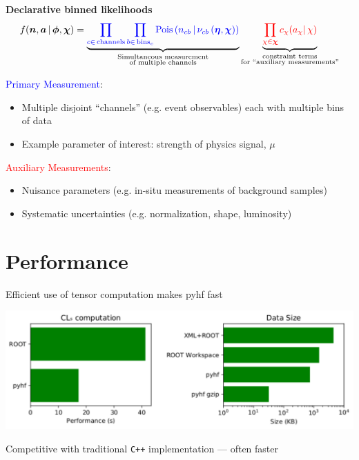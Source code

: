 \documentclass[a0paper,fleqn]{betterposter}
\begin{document}
{ \textbf{Declarative binned likelihoods}
 \vspace{1em}
 \[
  f(\bm{n}, \bm{a} \,|\,\bm{\phi},\bm{\chi}) = \underbrace{\color{blue}{\prod_{c\in\mathrm{\,channels}} \prod_{b \in \mathrm{\,bins}_c}\textrm{Pois}\left(n_{cb} \,\middle|\, \nu_{cb}\left(\bm{\eta},\bm{\chi}\right)\right)}}_{\substack{\text{Simultaneous measurement}\\%
    \text{of multiple channels}}} \underbrace{\color{red}{\prod_{\chi \in \bm{\chi}} c_{\chi}(a_{\chi} |\, \chi)}}_{\substack{\text{constraint terms}\\%
    \text{for }\text{``auxiliary measurements''}}}
 \]
 \vspace{1em}

 \textcolor{blue}{Primary Measurement}:
 \begin{itemize}
  \item Multiple disjoint ``channels'' (e.g.\!\!\!\! event observables) each with multiple bins of data
  \item Example parameter of interest: strength of physics signal, $\mu$
 \end{itemize}
 \textcolor{red}{Auxiliary Measurements}:
 \begin{itemize}
  \item Nuisance parameters (e.g.\!\!\!\! in-situ measurements of background samples)
  \item Systematic uncertainties (e.g. normalization, shape, luminosity)
 \end{itemize}

 \vfill
 \section{Performance}
 Efficient use of tensor computation makes pyhf fast
 \begin{center}
  \includegraphics[width=\textwidth]{performance_only.pdf}
 \end{center}
 Competitive with traditional \texttt{C++} implementation --- often faster
 \vfill
}
\end{document}
